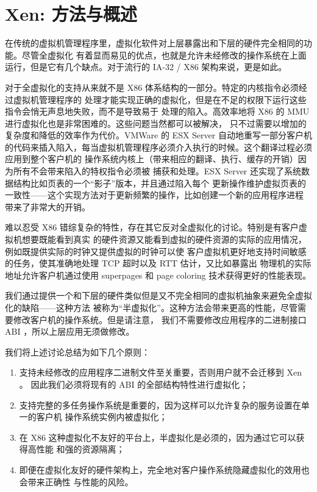 \section{Xen: 方法与概述}

在传统的虚拟机管理程序里，虚拟化软件对上层暴露出和下层的硬件完全相同的功能。尽管全虚拟化
有着显而易见的优点，也就是允许未经修改的操作系统在上面运行，但是它有几个缺点。对于流行的
IA-32 / X86 架构来说，更是如此。

对于全虚拟化的支持从来就不是 X86 体系结构的一部分。特定的内核指令必须经过虚拟机管理程序的
处理才能实现正确的虚拟化，但是在不足的权限下运行这些指令会悄无声息地失败，而不是导致易于
处理的陷入。高效率地将 X86 的 MMU 进行虚拟化也是非常困难的。这些问题当然都可以被解决，
只不过需要以增加的复杂度和降低的效率作为代价。VMWare 的 ESX Server 自动地重写一部分客户机
的代码来插入陷入，每当虚拟机管理程序必须介入执行的时候。这个翻译过程必须应用到整个客户机的
操作系统内核上（带来相应的翻译、执行、缓存的开销）因为所有不会带来陷入的特权指令必须被
捕获和处理。ESX Server 还实现了系统数据结构比如页表的一个“影子”版本，并且通过陷入每个
更新操作维护虚拟页表的一致性——这个实现方法对于更新频繁的操作，比如创建一个新的应用程序进程
带来了非常大的开销。

难以忍受 X86 错综复杂的特性，存在其它反对全虚拟化的讨论。特别是有客户虚拟机想要既能看到真实
的硬件资源又能看到虚拟的硬件资源的实际的应用情况，例如既提供实际的时钟又提供虚拟的时钟可以使
客户虚拟机更好地支持时间敏感的任务，使其准确地处理 TCP 超时以及 RTT 估计，又比如暴露出
物理机的实际地址允许客户机通过使用 superpages 和 page coloring 技术获得更好的性能表现。

我们通过提供一个和下层的硬件类似但是又不完全相同的虚拟机抽象来避免全虚拟化的缺陷——这种方法
被称为“半虚拟化”。这种方法会带来更高的性能，尽管需要修改客户机的操作系统。但是请注意，
我们不需要修改应用程序的二进制接口 ABI ，所以上层应用无须做修改。

我们将上述讨论总结为如下几个原则：

\begin{enumerate}
    \item 支持未经修改的应用程序二进制文件至关重要，否则用户就不会迁移到 Xen 。
    因此我们必须将现有的 ABI 的全部结构特性进行虚拟化；
    \item 支持完整的多任务操作系统是重要的，因为这样可以允许复杂的服务设置在单一的客户机
    操作系统实例内被虚拟化；
    \item 在 X86 这种虚拟化不友好的平台上，半虚拟化是必须的，因为通过它可以获得高性能
    和强的资源隔离；
    \item 即便在虚拟化友好的硬件架构上，完全地对客户操作系统隐藏虚拟化的效用也会带来正确性
    与性能的风险。
\end{enumerate}

